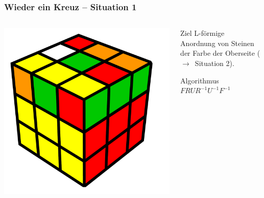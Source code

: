 \begin{frame}
	\frametitle{Wieder ein Kreuz -- Situation 1}
	
	\begin{columns}[c]
		\begin{column}[C]{.5\textwidth}
			\center
			\includegraphics[scale=0.3]{img/layer3nothing}
		\end{column}
		\begin{column}[C]{.5\textwidth}
			\begin{block}{Ziel}
				L-förmige Anordnung von Steinen der Farbe der Oberseite ($\rightarrow$~Situation 2).
			\end{block}
			\begin{exampleblock}{Algorithmus}
				$FRUR^{-1}U^{-1}F^{-1}$
			\end{exampleblock}
		\end{column}
	\end{columns}
	
\end{frame}

